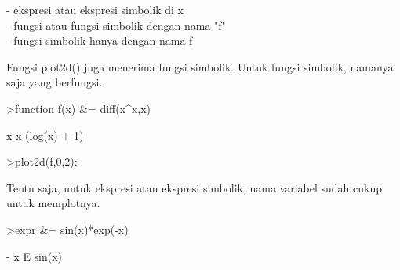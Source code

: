 \documentclass[a4paper,10pt]{article}
\begin{document}
\begin{eulernotebook}
\begin{eulercomment}
\begin{eulercomment}
\begin{eulercomment}
\begin{eulercomment}
\begin{eulercomment}
\begin{eulercomment}
\begin{eulercomment}
\begin{eulercomment}
\begin{eulercomment}
\begin{eulercomment}
\begin{eulercomment}
\begin{eulercomment}
\begin{eulercomment}
\begin{eulercomment}
\begin{eulercomment}
\begin{eulercomment}
\begin{eulercomment}
\begin{eulercomment}
\begin{eulercomment}
\begin{eulercomment}
\begin{eulercomment}
\begin{eulercomment}
\begin{eulercomment}
\begin{eulercomment}
\begin{eulercomment}
\begin{eulercomment}
\begin{eulercomment}
\begin{eulercomment}
\begin{eulercomment}
\begin{eulercomment}
\begin{eulercomment}
\begin{eulercomment}
\begin{eulercomment}
\begin{eulercomment}
\begin{eulercomment}
\begin{eulercomment}
\begin{eulercomment}
- ekspresi atau ekspresi simbolik di x\\
- fungsi atau fungsi simbolik dengan nama "f"\\
- fungsi simbolik hanya dengan nama f

Fungsi plot2d() juga menerima fungsi simbolik. Untuk fungsi simbolik,
namanya saja yang berfungsi.
\end{eulercomment}
\begin{eulerprompt}
>function f(x) &= diff(x^x,x)
\end{eulerprompt}
\begin{euleroutput}
  
                              x
                             x  (log(x) + 1)
  
\end{euleroutput}
\begin{eulerprompt}
>plot2d(f,0,2):
\end{eulerprompt}
\begin{eulercomment}
Tentu saja, untuk ekspresi atau ekspresi simbolik, nama variabel sudah
cukup untuk memplotnya.
\end{eulercomment}
\begin{eulerprompt}
>expr &= sin(x)*exp(-x)
\end{eulerprompt}
\begin{euleroutput}
  
                                - x
                               E    sin(x)
  

\end{euleroutput}
\end{eulercomment}
\end{eulercomment}
\end{eulercomment}
\end{eulercomment}
\end{eulercomment}
\end{eulercomment}
\end{eulercomment}
\end{eulercomment}
\end{eulercomment}
\end{eulercomment}
\end{eulercomment}
\end{eulercomment}
\end{eulercomment}
\end{eulercomment}
\end{eulercomment}
\end{eulercomment}
\end{eulercomment}
\end{eulercomment}
\end{eulercomment}
\end{eulercomment}
\end{eulercomment}
\end{eulercomment}
\end{eulercomment}
\end{eulercomment}
\end{eulercomment}
\end{eulercomment}
\end{eulercomment}
\end{eulercomment}
\end{eulercomment}
\end{eulercomment}
\end{eulercomment}
\end{eulercomment}
\end{eulercomment}
\end{eulercomment}
\end{eulercomment}
\end{eulercomment}
\end{eulernotebook}
\end{document}
